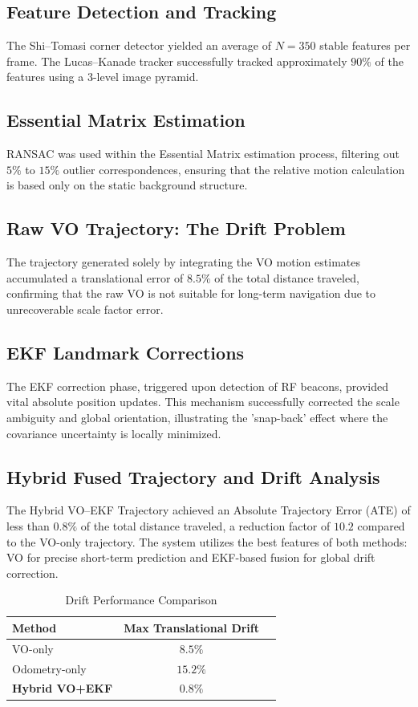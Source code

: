 \documentclass[conference]{IEEEtran}
\begin{document}
\subsection{Feature Detection and Tracking}
The Shi–Tomasi corner detector yielded an average of $N=350$ stable features per frame. The Lucas–Kanade tracker successfully tracked approximately $90\%$ of the features using a 3-level image pyramid.

\subsection{Essential Matrix Estimation}
RANSAC was used within the Essential Matrix estimation process, filtering out $5\%$ to $15\%$ outlier correspondences, ensuring that the relative motion calculation is based only on the static background structure.

\subsection{Raw VO Trajectory: The Drift Problem}
The trajectory generated solely by integrating the VO motion estimates accumulated a translational error of $\mathbf{8.5\%}$ of the total distance traveled, confirming that the raw VO is not suitable for long-term navigation due to unrecoverable scale factor error.

\subsection{EKF Landmark Corrections}
The EKF correction phase, triggered upon detection of RF beacons, provided vital absolute position updates. This mechanism successfully corrected the scale ambiguity and global orientation, illustrating the 'snap-back' effect where the covariance uncertainty is locally minimized.

\subsection{Hybrid Fused Trajectory and Drift Analysis}
The Hybrid VO–EKF Trajectory achieved an Absolute Trajectory Error (ATE) of less than $0.8\%$ of the total distance traveled, a reduction factor of $\mathbf{10.2}$ compared to the VO-only trajectory. The system utilizes the best features of both methods: VO for precise short-term prediction and EKF-based fusion for global drift correction.

\begin{table}[h]
\caption{Drift Performance Comparison}
\centering
\begin{tabular}{lcc}
\toprule
\textbf{Method} & \textbf{Max Translational Drift} \\
\midrule
VO-only & $8.5\%$ \\
Odometry-only & $15.2\%$ \\
\textbf{Hybrid VO+EKF} & $\mathbf{0.8\%}$ \\
\bottomrule
\end{tabular}
\end{table}
\end{document}
